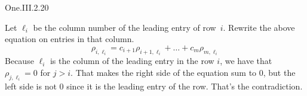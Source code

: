 \begin{ans}{One.III.2.20}
\begin{exparts}
          Let $\ell_{i}$ be the column number of the leading entry of
          row~$i$.
          Rewrite the above equation on entries in that column.
          \begin{equation*}
             \rho_{i,\ell_{i}}=c_{i+1}\rho_{i+1,\ell_{i}}
                             +\dots+c_m\rho_{m,\ell_{i}}
          \end{equation*}
          Because $\ell_{i}$ is the column of the leading entry in the
          row $i$, we have that $\rho_{j,\ell_{i}}=0$ for $j>i$.
          That makes the right side of the equation sum to $0$, but the
          left side is not $0$ since it is the leading entry of the row.
          That's the contradiction.
      \end{exparts}
    
\end{ans}
